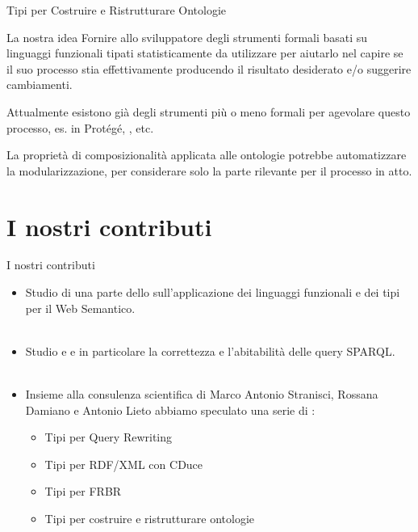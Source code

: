 \begin{frame}{Tipi per Costruire e Ristrutturare Ontologie}
	 \begin{block}{La nostra idea}
	 	Fornire allo sviluppatore degli strumenti formali basati su linguaggi funzionali tipati statisticamente da utilizzare per aiutarlo nel capire se il suo processo stia effettivamente producendo il risultato desiderato e/o suggerire cambiamenti.
	 \end{block}
	 Attualmente esistono già degli strumenti più o meno formali per agevolare questo processo, es. \textsc{} in Prot\'eg\'e, \textsc{}, etc.
	 \begin{example}
	 	La proprietà di composizionalità applicata alle ontologie potrebbe automatizzare la modularizzazione, per considerare solo la parte rilevante per il processo in atto.
	 \end{example}
\end{frame}

\section{I nostri contributi}
\begin{frame}{I nostri contributi}
    \begin{itemize}
        \item Studio di una parte dello  sull'applicazione dei linguaggi funzionali e dei tipi per il Web Semantico.\\~\\
        \item Studio e  e in particolare la correttezza e l'abitabilità delle query SPARQL.\\~\\
        \item Insieme alla consulenza scientifica di Marco Antonio Stranisci, Rossana Damiano e Antonio Lieto abbiamo speculato una serie di :
            \begin{itemize}
                \item Tipi per Query Rewriting
                \item Tipi per RDF/XML con CDuce
                \item Tipi per FRBR
                \item Tipi per costruire e ristrutturare ontologie
            \end{itemize}
    \end{itemize}
\end{frame}